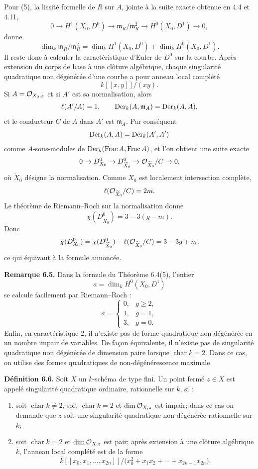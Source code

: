 \documentclass[11pt]{article}
\begin{document}
Pour (5), la lissité formelle de \(R\) sur \(A\), jointe à la suite exacte obtenue en 4.4 et 4.11,
\[
        0\to H^1(X_0,D^0)\to \mathfrak m_R/\mathfrak m_R^2
        \to H^0(X_0,D^1)\to 0,
\]
donne
\[
        \dim_k\mathfrak m_R/\mathfrak m_R^2
        =
        \dim_k H^1(X_0,D^0)+\dim_kH^0(X_0,D^1).
\]
Il reste donc à calculer la caractéristique d'Euler de \(D^0\) sur la courbe.  Après extension du corps de base à une clôture algébrique, chaque singularité quadratique non dégénérée d'une courbe a pour anneau local complété
\[
        k[[x,y]]/(xy).
\]
Si \(A=\mathcal O_{X_0,z}\) et si \(A'\) est sa normalisation, alors
\[
        \ell(A'/A)=1,\qquad
        \operatorname{Der}_k(A,\mathfrak m_A)=\operatorname{Der}_k(A,A),
\]
et le conducteur \(C\) de \(A\) dans \(A'\) est \(\mathfrak m_A\).  Par conséquent
\[
        \operatorname{Der}_k(A,A)=\operatorname{Der}_k(A',A')
\]
comme \(A\)-sous-modules de \(\operatorname{Der}_k(\operatorname{Frac} A,\operatorname{Frac} A)\), et l'on obtient une suite exacte
\[
        0\to D^0_{X_0}
        \to D^0_{\widetilde X_0}
        \to \mathcal O_{\widetilde X_0}/C
        \to 0,
\]
où \(\widetilde X_0\) désigne la normalisation.  Comme \(X_0\) est localement intersection complète,
\[
        \ell(\mathcal O_{\widetilde X_0}/C)=2m.
\]
Le théorème de Riemann--Roch sur la normalisation donne
\[
        \chi(D^0_{\widetilde X_0})=3-3(g-m).
\]
Donc
\[
        \chi(D^0_{X_0})
        =
        \chi(D^0_{\widetilde X_0})-\ell(\mathcal O_{\widetilde X_0}/C)
        =
        3-3g+m,
\]
ce qui équivaut à la formule annoncée.

\textbf{Remarque 6.5.}  Dans la formule du Théorème 6.4(5), l'entier
\[
        a=\dim_k H^0(X_0,D^1)
\]
se calcule facilement par Riemann--Roch :
\[
        a=
        \begin{cases}
        0,& g\geq 2,\\
        1,& g=1,\\
        3,& g=0.
        \end{cases}
\]
Enfin, en caractéristique \(2\), il n'existe pas de forme quadratique non dégénérée en un nombre impair de variables.  De façon équivalente, il n'existe pas de singularité quadratique non dégénérée de dimension paire lorsque \(\operatorname{char}k=2\).  Dans ce cas, on utilise des formes quadratiques de non-dégénérescence maximale.

\textbf{Définition 6.6.}  Soit \(X\) un \(k\)-schéma de type fini.  Un point fermé \(z\in X\) est appelé singularité quadratique ordinaire, rationnelle sur \(k\), si :
\begin{enumerate}[label=(\roman*)]
\item soit \(\operatorname{char}k\neq 2\), soit \(\operatorname{char}k=2\) et \(\dim\mathcal O_{X,z}\) est impair; dans ce cas on demande que \(z\) soit une singularité quadratique non dégénérée rationnelle sur \(k\);
\item soit \(\operatorname{char}k=2\) et \(\dim\mathcal O_{X,z}\) est pair; après extension à une clôture algébrique \(\bar k\), l'anneau local complété est de la forme
\[
        \bar k[[x_0,x_1,\ldots,x_{2n}]]
        /\bigl(x_0^2+x_1x_2+\cdots+x_{2n-1}x_{2n}\bigr).
\]
\end{enumerate}
\end{document}
